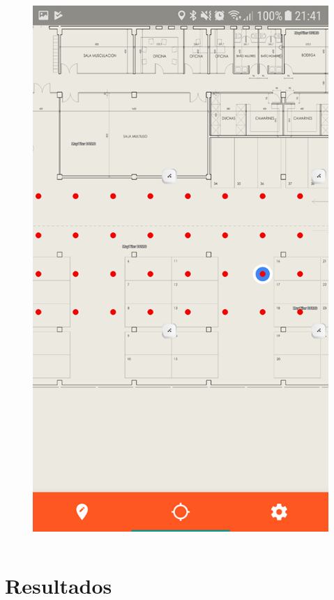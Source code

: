\documentclass[handout]{beamer}
\begin{document}
\begin{frame}
\begin{columns}[t]
\begin{figure}
\includegraphics[width=\textwidth]{../figures/fase_online3.png}
\end{figure}

\end{columns}

\end{frame}

\section{Resultados}
\end{document}
